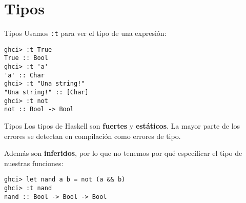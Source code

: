 \section{Tipos}

\begin{frame}[fragile]{Tipos}
  Usamos \texttt{:t} para ver el tipo de una expresión:
  \espacio
  \begin{lstlisting}
ghci> :t True
True :: Bool
ghci> :t 'a'
'a' :: Char
ghci> :t "Una string!"
"Una string!" :: [Char]
ghci> :t not
not :: Bool -> Bool
  \end{lstlisting}
\end{frame}

\begin{frame}[fragile]{Tipos}
  Los tipos de Haskell son \textbf{fuertes} y \textbf{estáticos}.
  La mayor parte de los errores se detectan en compilación como errores de tipo.
  
  \espacio

  Además son \textbf{inferidos}, por lo que no tenemos por qué especificar el
  tipo de nuestras funciones:

  \espacio

  \begin{lstlisting}
ghci> let nand a b = not (a && b)
ghci> :t nand
nand :: Bool -> Bool -> Bool
  \end{lstlisting}
  
\end{frame}

% 


